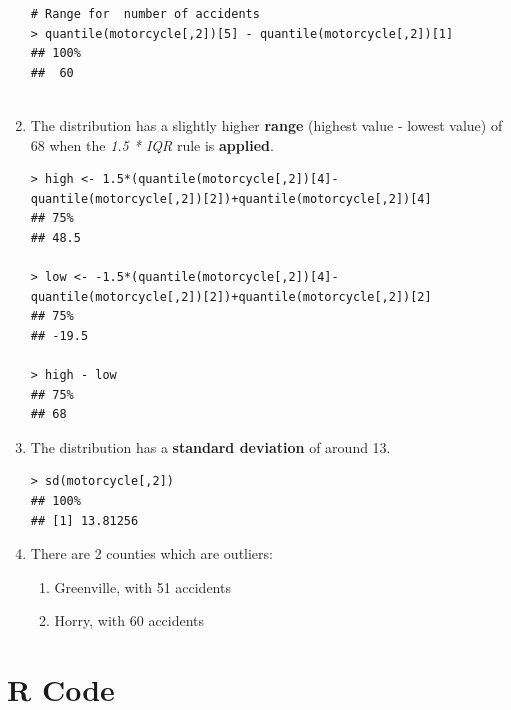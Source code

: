\documentclass[12pt,letterpaper,titlepage,en-US]{article}
\begin{document}
\begin{enumerate}
\begin{knitrout}
\begin{kframe}
\begin{verbatim}
# Range for  number of accidents
> quantile(motorcycle[,2])[5] - quantile(motorcycle[,2])[1]
## 100% 
##  60
  
\end{verbatim}
\end{kframe}
\end{knitrout}



\item The distribution has a slightly higher \textbf{range} (highest value - lowest value) of 68 when the \emph{1.5 * IQR} rule is \textbf{applied}.

\begin{knitrout}
\color{fgcolor}
\begin{kframe}

\begin{verbatim}
> high <- 1.5*(quantile(motorcycle[,2])[4]-
quantile(motorcycle[,2])[2])+quantile(motorcycle[,2])[4]
## 75%
## 48.5

> low <- -1.5*(quantile(motorcycle[,2])[4]-
quantile(motorcycle[,2])[2])+quantile(motorcycle[,2])[2]
## 75%
## -19.5

> high - low
## 75% 
## 68 
\end{verbatim}
\end{kframe}
\end{knitrout}


 \item The distribution has a \textbf{standard deviation} of around 13.
\begin{knitrout}
\color{fgcolor}
\begin{kframe}

\begin{verbatim}
> sd(motorcycle[,2])
## 100% 
## [1] 13.81256  
\end{verbatim}
\end{kframe}
\end{knitrout}



\item There are 2 counties which are outliers:
\begin{enumerate}
\item Greenville, with 51 accidents
\item Horry, with 60 accidents
\end{enumerate}
\end{enumerate}






\section{R Code}




\end{document}
